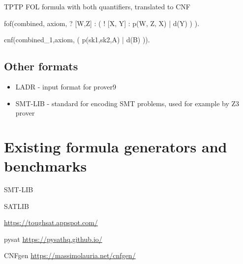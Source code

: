 \begin{listing}[H]
  \caption{TPTP FOL formula with both quantifiers, translated to CNF}
\begin{tptpcode}
fof(combined, axiom,
 ? [W,Z] : ( ! [X, Y] : p(W, Z, X)  | d(Y) )
  ).

cnf(combined_1,axiom,
    ( p(sk1,sk2,A) | d(B) )).
\end{tptpcode}
\end{listing}

\subsection{Other formats}

\begin{itemize}
  \item \gls{LADR} - input format for prover9
  \item SMT-LIB - standard for encoding SMT problems, used for example by Z3 prover
\end{itemize}


\section{Existing formula generators and benchmarks}

SMT-LIB \cite{BarFT-RR-17}

SATLIB \cite{Hol00}

\url{https://toughsat.appspot.com/}

pysat \url{https://pysathq.github.io/}

CNFgen \url{https://massimolauria.net/cnfgen/}
